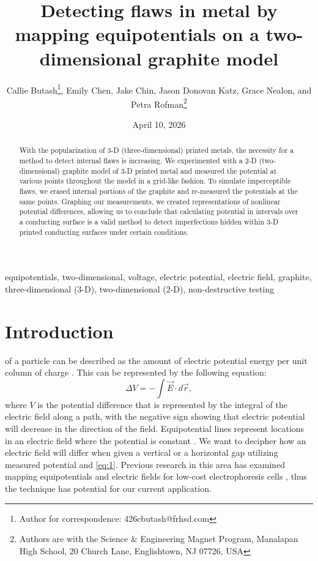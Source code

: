 \documentclass[10pt,journal,twoside]{IEEEtran} %
\title{Detecting flaws in metal by mapping equipotentials on a two-dimensional graphite model} %
\author{Callie Butash\thanks{Author for correspondence: 426cbutash@frhsd.com}, Emily Chen, Jake Chin, Jason Donovan Katz, Grace Nealon, and Petra Rofman\thanks{Authors are with the Science \& Engineering Magnet Program, Manalapan High School, 20 Church Lane, Englishtown, NJ 07726, USA}} %
\date{April 10, 2026}
\newcommand{\keywords}{equipotentials, two-dimensional, voltage, electric potential, electric field, graphite, three-dimensional (3-D), two-dimensional (2-D), non-destructive testing} %
\begin{document}
\maketitle

\begin{abstract}
With the popularization of 3-D (three-dimensional) printed metals, the necessity for a method to detect internal flaws is increasing. We experimented with a 2-D (two-dimensional) graphite model of 3-D printed metal and measured the potential at various points throughout the model in a grid-like fashion. To simulate imperceptible flaws, we erased internal portions of the graphite and re-measured the potentials at the same points. Graphing our measurements, we created representations of nonlinear potential differences, allowing us to conclude that calculating potential in intervals over a conducting surface is a valid method to detect imperfections hidden within 3-D printed conducting surfaces under certain conditions.
\end{abstract}

\begin{IEEEkeywords}
\keywords
\end{IEEEkeywords}

\section{Introduction}
 of a particle can be described as the amount of electric potential energy per unit column of charge \cite{tipler,barrons,openstax}. This can be represented by the following equation:
\begin{equation}
\Delta V = - \int \vec{E} \cdot d\vec{r},
\label{eq:1}
\end{equation}
where $V$ is the potential difference that is represented by the integral of the electric field along a path, with the negative sign showing that electric potential will decrease in the direction of the field. Equipotential lines represent locations in an electric field where the potential is constant \cite{nave:2000:hyperphysics,knight:2017:physics}. We want to decipher how an electric field will differ when given a vertical or a horizontal gap utilizing measured potential and \cref{eq:1}. Previous research in this area has examined mapping equipotentials and electric fields for low-cost electrophoresis cells \cite{ayyagari:2024:computational,baru:2024:demonstrating,cohen:2024:visualizing,edwards:2024:electric,kumar:2024:mapping}, thus the technique has potential for our current application. 
\end{document}
